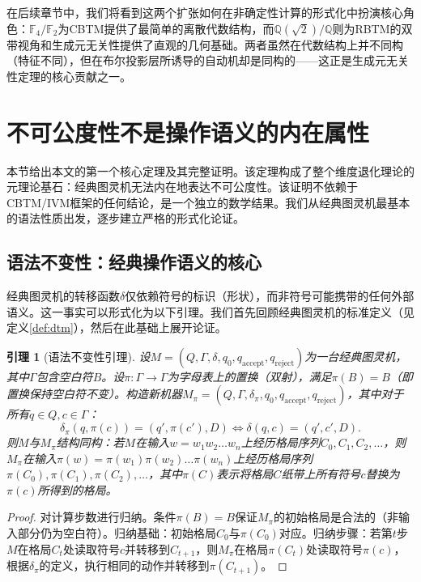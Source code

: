 \documentclass{ctexart}
\newtheorem{lemma}[theorem]{引理}
\newtheorem{proof}[theorem]{证明}
\begin{document}
	在后续章节中，我们将看到这两个扩张如何在非确定性计算的形式化中扮演核心角色：$\mathbb{F}_4/\mathbb{F}_2$为CBTM提供了最简单的离散代数结构，而$\mathbb{Q}(\sqrt{2})/\mathbb{Q}$则为RBTM的双带视角和生成元无关性提供了直观的几何基础。两者虽然在代数结构上并不同构（特征不同），但在布尔投影层所诱导的自动机却是同构的——这正是生成元无关性定理的核心贡献之一。
	
	
	\section{不可公度性不是操作语义的内在属性}
	
	本节给出本文的第一个核心定理及其完整证明。该定理构成了整个维度退化理论的元理论基石：经典图灵机无法内在地表达不可公度性。该证明不依赖于CBTM/IVM框架的任何结论，是一个独立的数学结果。我们从经典图灵机最基本的语法性质出发，逐步建立严格的形式化论证。
	
	\subsection{语法不变性：经典操作语义的核心}
	
	经典图灵机的转移函数$\delta$仅依赖符号的标识（形状），而非符号可能携带的任何外部语义。这一事实可以形式化为以下引理。我们首先回顾经典图灵机的标准定义（见定义\ref{def:dtm}），然后在此基础上展开论证。
	
	\begin{lemma}[语法不变性引理]\label{lem:syntactic-invariance}
		设$M = (Q, \Gamma, \delta, q_0, q_{\text{accept}}, q_{\text{reject}})$为一台经典图灵机，其中$\Gamma$包含空白符$B$。设$\pi: \Gamma \to \Gamma$为字母表上的置换（双射），满足$\pi(B) = B$（即置换保持空白符不变）。构造新机器$M_\pi = (Q, \Gamma, \delta_\pi, q_0, q_{\text{accept}}, q_{\text{reject}})$，其中对于所有$q \in Q, c \in \Gamma$：
		\[
		\delta_\pi(q, \pi(c)) = (q', \pi(c'), D) \iff \delta(q, c) = (q', c', D).
		\]
		则$M$与$M_\pi$结构同构：若$M$在输入$w = w_1 w_2 \ldots w_n$上经历格局序列$C_0, C_1, C_2, \ldots$，则$M_\pi$在输入$\pi(w) = \pi(w_1) \pi(w_2) \ldots \pi(w_n)$上经历格局序列$\pi(C_0), \pi(C_1), \pi(C_2), \ldots$，其中$\pi(C)$表示将格局$C$纸带上所有符号$c$替换为$\pi(c)$所得到的格局。
	\end{lemma}
	\begin{proof}
		对计算步数进行归纳。条件$\pi(B)=B$保证$M_\pi$的初始格局是合法的（非输入部分仍为空白符）。归纳基础：初始格局$C_0$与$\pi(C_0)$对应。归纳步骤：若第$t$步$M$在格局$C_t$处读取符号$c$并转移到$C_{t+1}$，则$M_\pi$在格局$\pi(C_t)$处读取符号$\pi(c)$，根据$\delta_\pi$的定义，执行相同的动作并转移到$\pi(C_{t+1})$。
	\end{proof}
	
\end{document}
